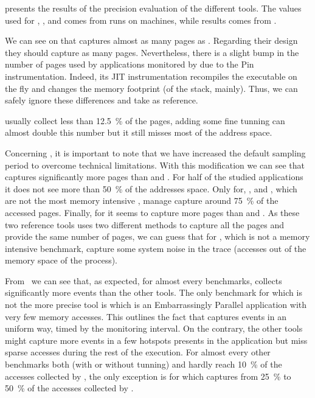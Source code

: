  presents the results of the precision evaluation of the
different tools. The values used for \Mitos, \MitosTun, \Moca and
\TABARNAC comes from runs on \Edel machines, while \MemProf results comes from
\Stremi.

We can see on  that \Moca captures almost as many pages as \TABARNAC.
Regarding their design they should capture as many pages. Nevertheless, there is a slight
bump in the number of pages used by applications monitored by \TABARNAC due to the Pin instrumentation.
Indeed, its JIT instrumentation recompiles the executable on the fly and changes the memory footprint
(of the stack, mainly). Thus, we can safely ignore these differences and take \Moca as reference.

\Mitos usually collect less than \SI{12.5}{\%} of the pages, adding some fine tunning
can almost double this number but it still misses most of the address space.

Concerning \MemProf, it is important to note that we have increased the
default sampling period to overcome technical limitations. With this
modification we can see that \MemProf captures significantly more pages than
\Mitos and \MitosTun. For half of the studied applications it does
not see more than \SI{50}{\%} of the addresses space. Only for, \BT, \LU and \UA,
which are not the most memory intensive \NPB, 
\MemProf manage capture around \SI{75}{\%} of the accessed pages. Finally, for
\SP it seems to capture more pages than \TABARNAC and \Moca. As these two reference
tools uses two different methods to capture all the pages and provide the 
same number of pages, we can guess that for \SP, which is not a memory
intensive benchmark, \MemProf capture some system noise in the trace (accesses out
of the memory space of the process).

From  we can see that, as expected, for almost every benchmarks,
\Moca collects significantly more events than the other tools.  The only
benchmark for which \Moca is not the more precise tool is \EP which is an
Embarrassingly Parallel application with very few memory accesses.
This outlines the fact that \Moca captures events in an uniform way, timed by the monitoring interval.
On the contrary, the other tools might capture more events in a few hotspots presents in the application but miss
sparse accesses during the rest of the execution.
For almost
every other benchmarks both \Mitos (with or without tunning) and \MemProf
hardly reach \SI{10}{\%} of the accesses collected by \Moca, the only exception is
\CG for which \MemProf captures from \SI{25}{\%} to \SI{50}{\%} of the accesses
collected by \Moca.

